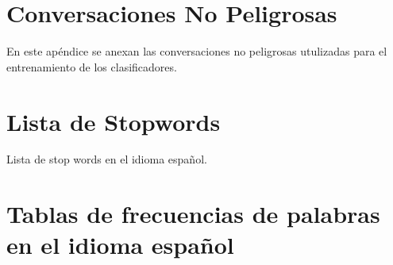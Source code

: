 \documentclass[oneside,10pt]{book}
\begin{document}
\chapter{Conversaciones No Peligrosas}\label{app:conversacionesnp}
En este ap\'endice se anexan las conversaciones no peligrosas utulizadas para el entrenamiento de los clasificadores.
%
%







%
%

%
%


%

%




\chapter{Lista de Stopwords}
\label{chap:stop}
Lista de stop words en el idioma espa\~nol.\cite{stop}
\chapter{Tablas de frecuencias de palabras en el idioma espa\~nol}
	
\end{document}
